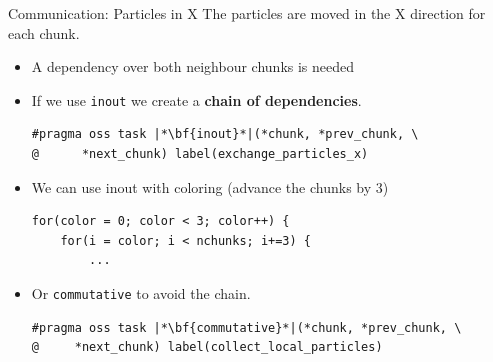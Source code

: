\documentclass{beamer}
\begin{document}
\begin{frame}[fragile]{Communication: Particles in X}
The particles are moved in the X direction for each chunk.

\begin{itemize}
\item A dependency over both neighbour chunks is needed
\item If we use \texttt{inout} we create a \textbf{chain of dependencies}.
\begin{lstlisting}
#pragma oss task |*\bf{inout}*|(*chunk, *prev_chunk, \
@      *next_chunk) label(exchange_particles_x)
\end{lstlisting}
\pause
\item We can use inout with coloring (advance the chunks by 3)
\begin{lstlisting}
for(color = 0; color < 3; color++) {
	for(i = color; i < nchunks; i+=3) {
		...
\end{lstlisting}
\pause
\item Or \texttt{commutative} to avoid the chain.
\begin{lstlisting}
#pragma oss task |*\bf{commutative}*|(*chunk, *prev_chunk, \
@     *next_chunk) label(collect_local_particles)
\end{lstlisting}
\end{itemize}


\end{frame}
\end{document}
